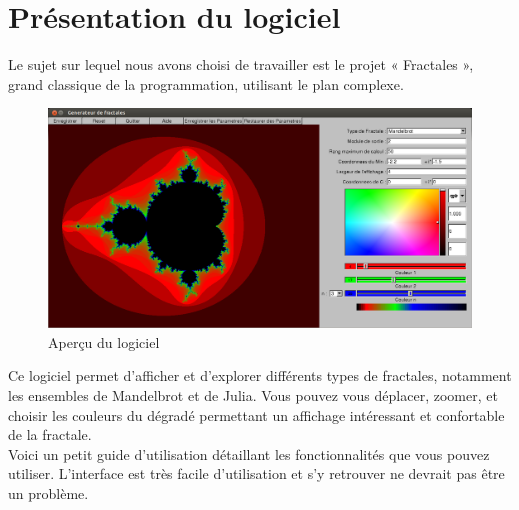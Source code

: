 \documentclass[a4paper,11pt]{article} \usepackage[T1]{fontenc} \usepackage[utf8]{inputenc} \usepackage[francais]{babel}
\begin{document}
\tableofcontents          %
\vspace{3cm}

\section{Présentation du logiciel}
Le sujet  sur lequel nous avons choisi de travailler est le projet « Fractales », grand classique de la programmation, utilisant le plan complexe.
\begin{figure}[H] \begin{center} \includegraphics[width=\textwidth]{Images/InterfaceTotale.png}
    \caption{Aperçu du logiciel}
\end{center} \end{figure}

Ce logiciel permet d'afficher et d'explorer différents types de fractales, notamment les ensembles de Mandelbrot et de Julia. Vous pouvez vous déplacer, zoomer, et choisir les couleurs du dégradé permettant un affichage intéressant et confortable de la fractale.\\

Voici un petit guide d'utilisation détaillant les fonctionnalités que vous pouvez utiliser. L'interface est très facile d'utilisation et s'y retrouver ne devrait pas être un problème.\\
\end{document}
